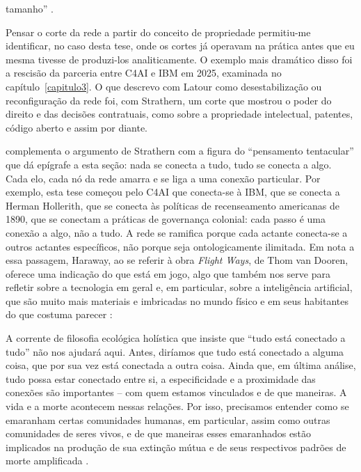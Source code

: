 tamanho'' \parencite[pp.~16--17]{strathern2011cortando}. 

Pensar o corte da rede a partir do conceito de propriedade permitiu-me identificar, no caso desta tese, onde os cortes já operavam na prática antes que eu mesma tivesse de produzi-los analiticamente. O exemplo mais dramático disso foi a rescisão da parceria entre C4AI e IBM em 2025, examinada no capítulo~\ref{capitulo3}. O que descrevo com Latour como desestabilização ou reconfiguração da rede foi, com Strathern, um corte que mostrou o poder do direito e das decisões contratuais, como sobre a propriedade intelectual, patentes, código aberto e assim por diante. 

\textcite{Haraway2023Ficar} complementa o argumento de Strathern com a figura do \enquote{pensamento tentacular} que dá epígrafe a esta seção: nada se conecta a tudo, tudo se conecta a algo. Cada elo, cada nó da rede amarra e se liga a uma conexão particular. Por exemplo, esta tese começou pelo C4AI que conecta-se à IBM, que se conecta a Herman Hollerith, que se conecta às políticas de recenseamento americanas de 1890, que se conectam a práticas de governança colonial: cada passo é uma conexão a algo, não a tudo. A rede se ramifica porque cada actante conecta-se a outros actantes específicos, não porque seja ontologicamente ilimitada. Em nota a essa passagem, Haraway, ao se referir à obra \textit{Flight Ways}, de Thom van Dooren, oferece uma indicação do que está em jogo, algo que também nos serve para refletir sobre a tecnologia em geral e, em particular, sobre a inteligência artificial, que são muito mais materiais e imbricadas no mundo físico e em seus habitantes do que costuma parecer \parencite{Crawford2021Atlas}:

\begin{citacaoabnt}
A corrente de filosofia ecológica holística que insiste que ``tudo está conectado a tudo'' não nos ajudará aqui. Antes, diríamos que tudo está conectado a alguma coisa, que por sua vez está conectada a outra coisa. Ainda que, em última análise, tudo possa estar conectado entre si, a especificidade e a proximidade das conexões são importantes -- com quem estamos vinculados e de que maneiras. A vida e a morte acontecem nessas relações. Por isso, precisamos entender como se emaranham certas comunidades humanas, em particular, assim como outras comunidades de seres vivos, e de que maneiras esses emaranhados estão implicados na produção de sua extinção mútua e de seus respectivos padrões de morte amplificada \parencite[p.~60, n.~4]{Haraway2023Ficar}.
\end{citacaoabnt}

